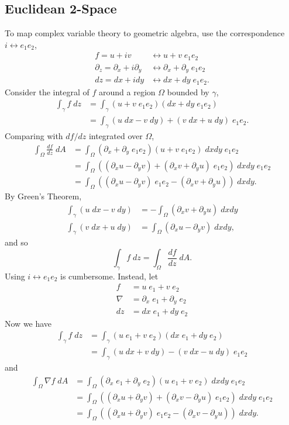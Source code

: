 \subsection{Euclidean 2-Space}
To map complex variable theory to geometric algebra, use the correspondence $i\leftrightarrow e_1e_2$,
\begin{align*}
f = u + iv &\leftrightarrow u + v\;e_1e_2\\
\partial_z = \partial_x + i\partial_y &\leftrightarrow \partial_x + \partial_y\;e_1e_2\\
dz = dx + idy &\leftrightarrow dx + dy\;e_1e_2.
\end{align*}
Consider the integral of $f$ around a region $\Omega$ bounded by $\gamma$,
\begin{align*}
\int_\gamma f\;dz &= \int_\gamma \left(u + v\;e_1e_2\right)\left(dx + dy\;e_1e_2\right)\\
&= \int_\gamma \left(u\;dx - v\;dy\right) + \left(v\;dx + u\;dy\right)\;e_1e_2.
\end{align*}
Comparing with $df/dz$ integrated over $\Omega$,
\begin{align*}
\int_\Omega \frac{df}{dz}\;dA &= \int_\Omega \left(\partial_x + \partial_y\;e_1e_2\right)\left(u + v\;e_1e_2\right)\;dxdy\;e_1e_2\\
&= \int_\Omega \left(\left(\partial_x u - \partial_y v\right) +\left(\partial_x v + \partial_y u\right)\;e_1e_2\right)\;dxdy\;e_1e_2\\
&= \int_\Omega \left(\left(\partial_x u - \partial_y v\right)\;e_1e_2 - \left(\partial_x v + \partial_y u\right)\right)\;dxdy.
\end{align*}
By Green's Theorem,
\begin{align*}
\int_\gamma \left(u\;dx - v\;dy\right) &= -\int_\Omega \left(\partial_x v + \partial_y u\right)\;dxdy\\
\int_\gamma \left(v\;dx + u\;dy\right) &= \int_\Omega \left(\partial_x u - \partial_y v\right)\;dxdy,
\end{align*}
and so
\[
\int_\gamma f \; dz = \int_\Omega \frac{df}{dz}\;dA.
\]
Using $i \leftrightarrow e_1e_2$ is cumbersome. Instead, let
\begin{align*}
f &= u\;e_1 + v\;e_2 \\
\nabla &= \partial_x\;e_1 + \partial_y \; e_2 \\
dz &= dx\;e_1 + dy\;e_2
\end{align*}
Now we have
\begin{align*}
\int_\gamma f\;dz &= \int_\gamma \left(u\;e_1 + v\;e_2\right)\left(dx\;e_1 + dy\;e_2\right)\\
&= \int_\gamma \left(u\;dx + v\;dy\right) - \left(v\;dx - u\;dy\right)\;e_1e_2
\end{align*}
and
\begin{align*}
\int_\Omega \nabla f\;dA &= \int_\Omega \left(\partial_x\;e_1 + \partial_y\;e_2\right)\left(u\;e_1 + v\;e_2\right)\;dxdy\;e_1e_2\\
&= \int_\Omega \left(\left(\partial_x u + \partial_y v\right) +\left(\partial_x v - \partial_y u\right)\;e_1e_2\right)\;dxdy\;e_1e_2\\
&= \int_\Omega \left(\left(\partial_x u + \partial_y v\right)\;e_1e_2 - \left(\partial_x v - \partial_y u\right)\right)\;dxdy.
\end{align*}